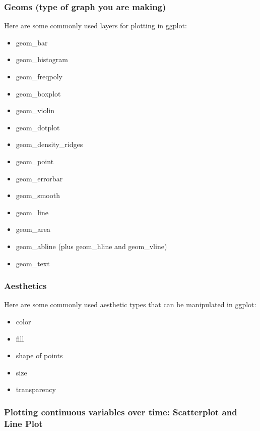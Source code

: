 \documentclass[]{article}
\providecommand{\tightlist}{%
  \setlength{\itemsep}{0pt}\setlength{\parskip}{0pt}}
\begin{document}
\subsubsection{Geoms (type of graph you are
making)}\label{geoms-type-of-graph-you-are-making}

Here are some commonly used layers for plotting in ggplot:

\begin{itemize}
\tightlist
\item
  geom\_bar
\item
  geom\_histogram
\item
  geom\_freqpoly
\item
  geom\_boxplot
\item
  geom\_violin
\item
  geom\_dotplot
\item
  geom\_density\_ridges
\item
  geom\_point
\item
  geom\_errorbar
\item
  geom\_smooth
\item
  geom\_line
\item
  geom\_area
\item
  geom\_abline (plus geom\_hline and geom\_vline)
\item
  geom\_text
\end{itemize}

\subsubsection{Aesthetics}\label{aesthetics}

Here are some commonly used aesthetic types that can be manipulated in
ggplot:

\begin{itemize}
\tightlist
\item
  color
\item
  fill
\item
  shape of points
\item
  size
\item
  transparency
\end{itemize}

\subsubsection{Plotting continuous variables over time: Scatterplot and
Line
Plot}\label{plotting-continuous-variables-over-time-scatterplot-and-line-plot}
\end{document}
